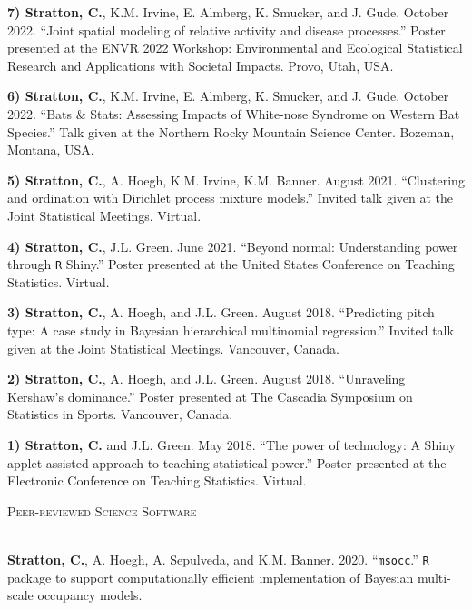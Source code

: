\documentclass[a4paper]{article}
\newcommand{\lineunder} {
	\vspace*{-8pt} \\
	\hspace*{-18pt} \hrulefill \\
}
\newcommand{\header} [1] {
	{\hspace*{-18pt}\vspace*{6pt} \textcolor{Cerulean}{\textsc{#1}}}
	\vspace*{-6pt} \textcolor{Cerulean}{\lineunder}
}
\begin{document}
\textbf{7) Stratton, C.}, K.M. Irvine, E. Almberg, K. Smucker, and J.
Gude. October 2022. ``Joint spatial modeling of relative activity and
disease processes.'' Poster presented at the ENVR 2022 Workshop:
Environmental and Ecological Statistical Research and Applications with
Societal Impacts. Provo, Utah, USA. \vspace*{2mm}

\textbf{6) Stratton, C.}, K.M. Irvine, E. Almberg, K. Smucker, and J.
Gude. October 2022. ``Bats \& Stats: Assessing Impacts of White-nose
Syndrome on Western Bat Species.'' Talk given at the Northern Rocky
Mountain Science Center. Bozeman, Montana, USA. \vspace*{2mm}

\textbf{5) Stratton, C.}, A. Hoegh, K.M. Irvine, K.M. Banner. August
2021. ``Clustering and ordination with Dirichlet process mixture
models.'' Invited talk given at the Joint Statistical Meetings. Virtual.
\vspace*{2mm}

\textbf{4) Stratton, C.}, J.L. Green. June 2021. ``Beyond normal:
Understanding power through \texttt{R} Shiny.'' Poster presented at the
United States Conference on Teaching Statistics. Virtual. \vspace*{2mm}

\textbf{3) Stratton, C.}, A. Hoegh, and J.L. Green. August 2018.
``Predicting pitch type: A case study in Bayesian hierarchical
multinomial regression.'' Invited talk given at the Joint Statistical
Meetings. Vancouver, Canada. \vspace*{2mm}

\textbf{2) Stratton, C.}, A. Hoegh, and J.L. Green. August 2018.
``Unraveling Kershaw's dominance.'' Poster presented at The Cascadia
Symposium on Statistics in Sports. Vancouver, Canada. \vspace*{2mm}

\textbf{1) Stratton, C.} and J.L. Green. May 2018. ``The power of
technology: A Shiny applet assisted approach to teaching statistical
power.'' Poster presented at the Electronic Conference on Teaching
Statistics. Virtual. \vspace*{2mm}

\header{Peer-reviewed Science Software}
\vspace*{2mm}

\textbf{Stratton, C.}, A. Hoegh, A. Sepulveda, and K.M. Banner. 2020.
``\texttt{msocc}.'' \texttt{R} package to support computationally
efficient implementation of Bayesian multi-scale occupancy models.
\vspace*{2mm}
\end{document}
